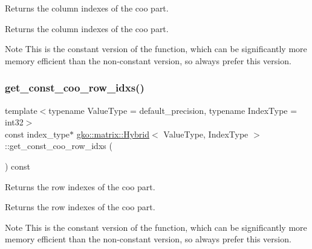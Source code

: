 Returns the column indexes of the coo part. 

\begin{DoxyReturn}{Returns}
the column indexes of the coo part.
\end{DoxyReturn}
\begin{DoxyNote}{Note}
This is the constant version of the function, which can be significantly more memory efficient than the non-\/constant version, so always prefer this version. 
\end{DoxyNote}
\mbox{\label{classgko_1_1matrix_1_1Hybrid_ae0d4b0c9151011ef879055f504f79f63}} 
\subsubsection{\texorpdfstring{get\+\_\+const\+\_\+coo\+\_\+row\+\_\+idxs()}{get\_const\_coo\_row\_idxs()}}
{\footnotesize\ttfamily template$<$typename Value\+Type = default\+\_\+precision, typename Index\+Type = int32$>$ \\
const index\+\_\+type$\ast$ \hyperlink{classgko_1_1matrix_1_1Hybrid}{gko\+::matrix\+::\+Hybrid}$<$ Value\+Type, Index\+Type $>$\+::get\+\_\+const\+\_\+coo\+\_\+row\+\_\+idxs (\begin{DoxyParamCaption}{ }\end{DoxyParamCaption}) const\hspace{0.3cm}{\ttfamily [noexcept]}}



Returns the row indexes of the coo part. 

\begin{DoxyReturn}{Returns}
the row indexes of the coo part.
\end{DoxyReturn}
\begin{DoxyNote}{Note}
This is the constant version of the function, which can be significantly more memory efficient than the non-\/constant version, so always prefer this version. 
\end{DoxyNote}
\mbox{\label{classgko_1_1matrix_1_1Hybrid_a9b066402b6f3727196c9945a80f08a6e}} 
